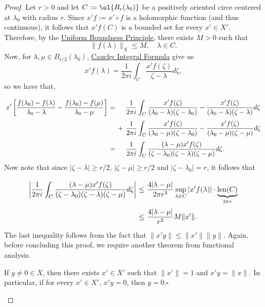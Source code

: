 \begin{proof}
    Let $r > 0$ and let $C := \ol{B_{r}(\lambda_0)}$ be a positively oriented circe centered at $\lambda_0$ with radius $r$. Since $x'f := x'\circ f$ is a holomorphic function (and thus continuous), it follows that $x'f(C)$ is a bounded set for every $x'\in X'$. Therefore, by the \hyperref[lem:uniform_boundness_principle]{Uniform Boundness Principle}, there exists $M > 0$ such that
    \[ \|f(\lambda)\|_X \leq M,\quad \lambda \in C. \]
    Now, for $\lambda,\mu \in B_{r/2}(\lambda_0)$, \hyperref[thm:cauchy_integral_formula_basic]{Cauchy Integral Formula} give us
    \[ x'f(\lambda) = \frac{1}{2\pi i}\int_{C} \frac{x' f(\zeta)}{\zeta - \lambda} d\zeta, \]
    so we have that,
    \[ \everymath{\displaystyle}
    \arraycolsep=1.8pt\def\arraystretch{2.5}
    \begin{array}{rcll}
        x'\left[ \frac{f(\lambda_0)-f(\lambda)}{\lambda_0 - \lambda} - \frac{f(\lambda_0)-f(\mu)}{\lambda_0 - \mu} \right] & = & & \frac{1}{2\pi i} \int_C \frac{x'f(\zeta)}{(\lambda_0 - \lambda)(\zeta - \lambda_0)} - \frac{x'f(\zeta)}{(\lambda_0 - \lambda)(\zeta - \lambda)} d\zeta\\
        & & + & \frac{1}{2\pi i} \int_C \frac{x'f(\zeta)}{(\lambda_0 - \mu)(\zeta - \lambda_0)} - \frac{x'f(\zeta)}{(\lambda_0 - \mu)(\zeta - \mu)} d\zeta\\
        & = & & \frac{1}{2\pi i} \int_C \frac{(\lambda-\mu) x'f(\zeta) }{(\zeta - \lambda_0)(\zeta - \lambda)(\zeta - \mu)} d\zeta.
    \end{array} \]
    Now note that since $|\zeta - \lambda| \geq  r/2$, $|\zeta - \mu| \geq r/2$ and $|\zeta - \lambda_0| = r$, it follows that
    \[ \everymath{\displaystyle}
    \arraycolsep=1.8pt\def\arraystretch{2.5}
    \begin{array}{rcl}
        \left| \frac{1}{2\pi i} \int_C \frac{(\lambda-\mu) x'f(\zeta)}{(\zeta - \lambda_0)(\zeta - \lambda)(\zeta - \mu)} d\zeta \right| & \leq & \frac{4|\lambda-\mu|}{2\pi r^3} \sup_{\lambda \in C} |x' f(\lambda)| \cdot \underbrace{\mbox{len}(C)}_{2\pi r} \\
        & \leq & \frac{4 |\lambda-\mu|}{r^2} M \|x'\|.    \end{array}\]
    The last inequality follows from the fact that $\|x'y\| \leq \|x'\| \|y\|$. Again, before concluding this proof, we require another theorem from functional analysis.
    \begin{lemma}\label{lem:hahn_banach_thm} If $y \neq 0 \in X$, then there exists $x' \in X'$ such that $\|x'\| = 1$ and $x'y = \|x\|$. In particular, if for every $x'\in X'$, $x'y = 0$, then $y = 0$.\hfill $\square$

\end{lemma}
\end{proof}
